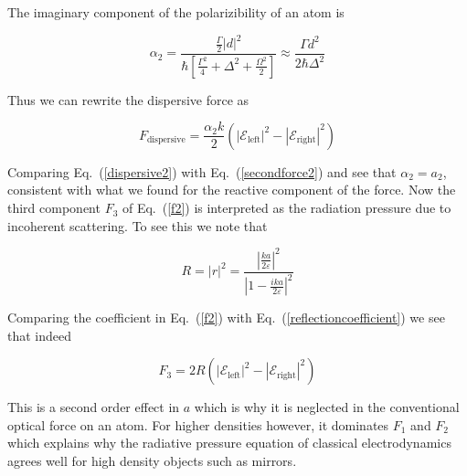 The imaginary component of the polarizibility of an atom is \cite{cohentannoudji}


\begin{equation}
\alpha_{2}=\frac{\frac{\Gamma}{2}\left|d\right|^{2}}{\hbar\left[\frac{\Gamma^{2}}{4}+\Delta^{2}+\frac{\Omega^{2}}{2}\right]}\approx\frac{\Gamma d^{2}}{2\hbar\Delta^{2}}
\label{polarizibility2}
\end{equation}

Thus we can rewrite the dispersive force as

\begin{equation}
F_{\mathrm{dispersive}}=\frac{\alpha_{2}k}{2}\left(\left|\mathcal{E}_{\mathrm{left}}\right|^{2}-\left|\mathcal{E}_{\mathrm{right}}\right|^{2}\right)
\label{dispersive2}
\end{equation}


Comparing Eq.\ (\ref{dispersive2}) with Eq.\ (\ref{secondforce2}) and see that $\alpha_{2}=a_{2}$, consistent with what we found for the reactive component of the force.  Now the third component $F_{3}$ of Eq.\ (\ref{f2}) is interpreted as the radiation pressure due to incoherent scattering.  To see this we note that

\begin{equation}
R=\left|r\right|^{2}=\frac{\left|\frac{ka}{2\varepsilon}\right|^{2}}{\left|1-\frac{ika}{2\varepsilon}\right|^{2}}
\label{reflectioncoefficient}
\end{equation}

Comparing the coefficient in Eq.\ (\ref{f2}) with Eq.\ (\ref{reflectioncoefficient}) we see that indeed

\begin{equation}
F_{3}=2 R \left(\left|\mathcal{E}_{\mathrm{left}}\right|^{2}-\left|\mathcal{E}_{\mathrm{right}}\right|^{2}\right)
\label{incoherentforce}
\end{equation}

This is a second order effect in $a$ which is why it is neglected in the conventional optical force on an atom.  For higher densities however, it dominates $F_{1}$ and $F_{2}$ which explains why the radiative pressure equation of classical electrodynamics \cite{griffiths} agrees well for high density objects such as mirrors.  




